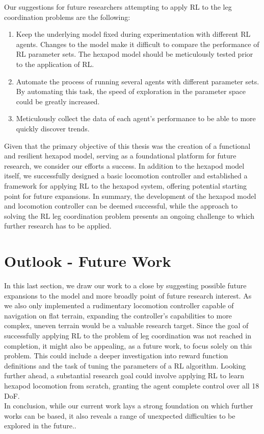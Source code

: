 Our suggestions for future researchers attempting to apply RL to the leg coordination problems are the following:
\begin{enumerate}
	\item Keep the underlying model fixed during experimentation with different RL agents. 
	Changes to the model make it difficult to compare the performance of RL parameter sets.
	The hexapod model should be meticulously tested prior to the application of RL.
	
	\item Automate the process of running several agents with different parameter sets. 
	By automating this task, the speed of exploration in the parameter space could be greatly increased.
	
	\item Meticulously collect the data of each agent's performance to be able to more quickly discover trends.
	
\end{enumerate}

Given that the primary objective of this thesis was the creation of a functional and resilient hexapod model, serving as a foundational platform for future research, we consider our efforts a success.
In addition to the hexapod model itself, we successfully designed a basic locomotion controller and established a framework for applying RL to the hexapod system, offering potential starting point for future expansions.
In summary, the development of the hexapod model and locomotion controller can be deemed successful, while the approach to solving the RL leg coordination problem presents an ongoing challenge to which further research has to be applied.


\section{Outlook - Future Work}

In this last section, we draw our work to a close by suggesting possible future expansions to the model and more broadly point of future research interest.
As we also only implemented a rudimentary locomotion controller capable of navigation on flat terrain, expanding the controller's capabilities to more complex, uneven terrain would be a valuable research target.
Since the goal of successfully applying RL to the problem of leg coordination was not reached in completion, it might also be appealing, as a future work, to focus solely on this problem.
This could include a deeper investigation into reward function definitions and the task of tuning the parameters of a RL algorithm.
Looking further ahead, a substantial research goal could involve applying RL to learn hexapod locomotion from scratch, granting the agent complete control over all 18 DoF.\\
In conclusion, while our current work lays a strong foundation on which further works can be based, it also reveals a range of unexpected difficulties to be explored in the future..


